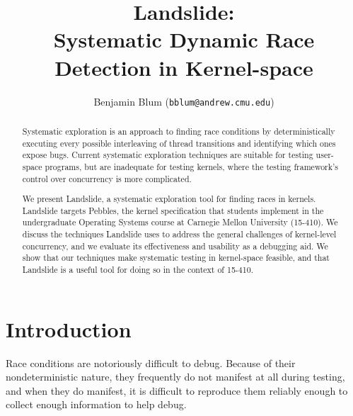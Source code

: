 \documentclass[10pt,twocolumn]{article}
\begin{document}
\title{\bf Landslide: \\ Systematic Dynamic Race Detection in Kernel-space}
\author{Benjamin Blum (\texttt{bblum@andrew.cmu.edu})}
\maketitle

\newcommand\true{\;\textit{true}}
\newcommand\false{\;\textit{false}}

\newcommand\alpher\alpha
\newcommand\beter\beta
\newcommand\gammer\gamma
\newcommand\delter\delta
\newcommand\zeter\zeta
\newcommand\Sigmer\Sigma

\newcommand\NN{\mathbb{N}}
\newcommand\QQ{\mathbb{Q}}
\newcommand\RR{\mathbb{R}}
\newcommand\ZZ{\mathbb{Z}}

\begin{abstract}
Systematic exploration is an approach to finding race conditions by deterministically executing every possible interleaving of thread transitions and identifying which ones expose bugs.
Current systematic exploration techniques are suitable for testing user-space programs, but are inadequate for testing kernels, where the testing framework's control over concurrency is more complicated.

We present Landslide, a systematic exploration tool for finding races in kernels.
Landslide targets Pebbles, the kernel specification that students implement in the undergraduate Operating Systems course at Carnegie Mellon University (15-410).
We discuss the techniques Landslide uses to address the general challenges of kernel-level concurrency, and we evaluate its effectiveness and usability as a debugging aid.
We show that our techniques make systematic testing in kernel-space feasible, and that Landslide is a useful tool for doing so in the context of 15-410.
\end{abstract}

\section{Introduction}

Race conditions are notoriously difficult to debug.
Because of their nondeterministic nature, they frequently do not manifest at all during testing, and when they do manifest, it is difficult to reproduce them reliably enough to collect enough information to help debug.
\end{document}
